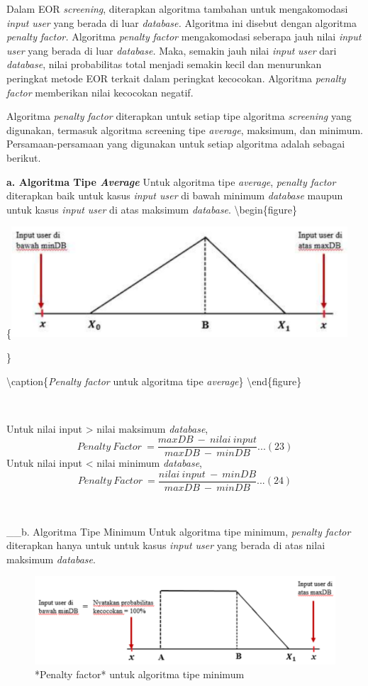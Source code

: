 \documentclass[
]{book}
\begin{document}
Dalam EOR \emph{screening}, diterapkan algoritma tambahan untuk mengakomodasi \emph{input} \emph{user} yang berada di luar \emph{database.} Algoritma ini disebut dengan algoritma \emph{penalty} \emph{factor.} Algoritma \emph{penalty} \emph{factor} mengakomodasi seberapa jauh nilai \emph{input} \emph{user} yang berada di luar \emph{database.} Maka, semakin jauh nilai \emph{input} \emph{user} dari \emph{database}, nilai probabilitas total menjadi semakin kecil dan menurunkan peringkat metode EOR terkait dalam peringkat kecocokan. Algoritma \emph{penalty} \emph{factor} memberikan nilai kecocokan negatif.

Algoritma \emph{penalty} \emph{factor} diterapkan untuk setiap tipe algoritma \emph{screening} yang digunakan, termasuk algoritma screening tipe \emph{average}, maksimum, dan minimum. Persamaan-persamaan yang digunakan untuk setiap algoritma adalah sebagai berikut.

\textbf{a. Algoritma Tipe \emph{Average}}
Untuk algoritma tipe \emph{average}, \emph{penalty factor} diterapkan baik untuk kasus \emph{input user} di bawah minimum \emph{database} maupun untuk kasus \emph{input user} di atas maksimum \emph{database}.
\textbackslash begin\{figure\}

\{\centering \includegraphics[width=0.5\linewidth]{images/screening/tipe_average1}

\}

\textbackslash caption\{\emph{Penalty factor} untuk algoritma tipe \emph{average}\}\label{fig:unnamed-chunk-29}
\textbackslash end\{figure\}

~

Untuk nilai input \textgreater{} nilai maksimum \emph{database},
\[Penalty\ Factor\ = \frac{maxDB\ -\ nilai\ input}{maxDB\ -\ minDB}...(23)\]
Untuk nilai input \textless{} nilai minimum \emph{database},
\[Penalty\ Factor\ = \frac{nilai\ input\ -\ minDB}{maxDB\ -\ minDB}...(24)\]

~

\_\_b. Algoritma Tipe Minimum
Untuk algoritma tipe minimum, \emph{penalty factor} diterapkan hanya untuk untuk kasus \emph{input user} yang berada di atas nilai maksimum \emph{database}.

\begin{figure}

{\centering \includegraphics[width=0.5\linewidth]{images/screening/tipe_minimum1} 

}

\caption{*Penalty factor* untuk algoritma tipe minimum}\label{fig:unnamed-chunk-30}
\end{figure}
\end{document}
